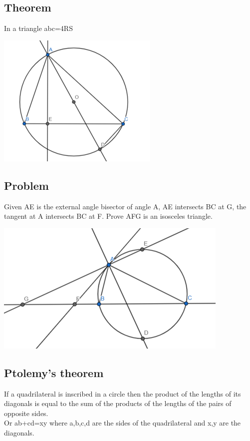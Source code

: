 \documentclass{article}
\begin{document}
\pagebreak

\subsection{Theorem}
In a triangle abc=4RS

\includegraphics{Picture18.png}

\pagebreak

\subsection{Problem}

Given AE is the external angle bisector of angle A, 
AE intersects BC at G, 
the tangent at A intersects BC at F. 
Prove AFG is an isosceles triangle.

\includegraphics{Picture19.png}

\pagebreak

\subsection{Ptolemy's theorem}

If a quadrilateral is inscribed in a circle then the product of the lengths of its diagonals is equal to the sum of the products of the lengths of the pairs of opposite sides.
\\Or ab+cd=xy where a,b,c,d are the sides of the quadrilateral and x,y are the diagonals.
\end{document}
